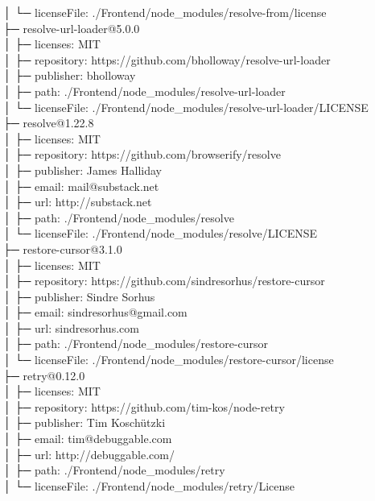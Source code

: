 \documentclass[
    paper=a4,
    twoside=false,
    parskip=half,
    listof=entryprefix,
    listof=totoc,
    index=totoc,
    bibliography=totoc,
    headsepline,
]{scrbook}
\begin{document}
    │  └─ licenseFile: ./Frontend/node\_modules/resolve-from/license\\
    ├─ resolve-url-loader@5.0.0\\
    │  ├─ licenses: MIT\\
    │  ├─ repository: https://github.com/bholloway/resolve-url-loader\\
    │  ├─ publisher: bholloway\\
    │  ├─ path: ./Frontend/node\_modules/resolve-url-loader\\
    │  └─ licenseFile: ./Frontend/node\_modules/resolve-url-loader/LICENSE\\
    ├─ resolve@1.22.8\\
    │  ├─ licenses: MIT\\
    │  ├─ repository: https://github.com/browserify/resolve\\
    │  ├─ publisher: James Halliday\\
    │  ├─ email: mail@substack.net\\
    │  ├─ url: http://substack.net\\
    │  ├─ path: ./Frontend/node\_modules/resolve\\
    │  └─ licenseFile: ./Frontend/node\_modules/resolve/LICENSE\\
    ├─ restore-cursor@3.1.0\\
    │  ├─ licenses: MIT\\
    │  ├─ repository: https://github.com/sindresorhus/restore-cursor\\
    │  ├─ publisher: Sindre Sorhus\\
    │  ├─ email: sindresorhus@gmail.com\\
    │  ├─ url: sindresorhus.com\\
    │  ├─ path: ./Frontend/node\_modules/restore-cursor\\
    │  └─ licenseFile: ./Frontend/node\_modules/restore-cursor/license\\
    ├─ retry@0.12.0\\
    │  ├─ licenses: MIT\\
    │  ├─ repository: https://github.com/tim-kos/node-retry\\
    │  ├─ publisher: Tim Koschützki\\
    │  ├─ email: tim@debuggable.com\\
    │  ├─ url: http://debuggable.com/\\
    │  ├─ path: ./Frontend/node\_modules/retry\\
    │  └─ licenseFile: ./Frontend/node\_modules/retry/License\\
\end{document}
